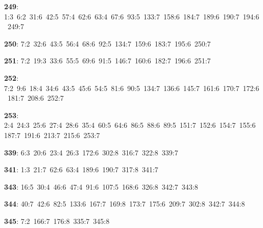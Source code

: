 \noindent \textbf{249}: 1:3\allowbreak\ 6:2\allowbreak\ 31:6\allowbreak\ 42:5\allowbreak\ 57:4\allowbreak\ 62:6\allowbreak\ 63:4\allowbreak\ 67:6\allowbreak\ 93:5\allowbreak\ 133:7\allowbreak\ 158:6\allowbreak\ 184:7\allowbreak\ 189:6\allowbreak\ 190:7\allowbreak\ 194:6\allowbreak\ 249:7\par
\noindent \textbf{250}: 7:2\allowbreak\ 32:6\allowbreak\ 43:5\allowbreak\ 56:4\allowbreak\ 68:6\allowbreak\ 92:5\allowbreak\ 134:7\allowbreak\ 159:6\allowbreak\ 183:7\allowbreak\ 195:6\allowbreak\ 250:7\par
\noindent \textbf{251}: 7:2\allowbreak\ 19:3\allowbreak\ 33:6\allowbreak\ 55:5\allowbreak\ 69:6\allowbreak\ 91:5\allowbreak\ 146:7\allowbreak\ 160:6\allowbreak\ 182:7\allowbreak\ 196:6\allowbreak\ 251:7\par
\noindent \textbf{252}: 7:2\allowbreak\ 9:6\allowbreak\ 18:4\allowbreak\ 34:6\allowbreak\ 43:5\allowbreak\ 45:6\allowbreak\ 54:5\allowbreak\ 81:6\allowbreak\ 90:5\allowbreak\ 134:7\allowbreak\ 136:6\allowbreak\ 145:7\allowbreak\ 161:6\allowbreak\ 170:7\allowbreak\ 172:6\allowbreak\ 181:7\allowbreak\ 208:6\allowbreak\ 252:7\par
\noindent \textbf{253}: 2:4\allowbreak\ 24:3\allowbreak\ 25:6\allowbreak\ 27:4\allowbreak\ 28:6\allowbreak\ 35:4\allowbreak\ 60:5\allowbreak\ 64:6\allowbreak\ 86:5\allowbreak\ 88:6\allowbreak\ 89:5\allowbreak\ 151:7\allowbreak\ 152:6\allowbreak\ 154:7\allowbreak\ 155:6\allowbreak\ 187:7\allowbreak\ 191:6\allowbreak\ 213:7\allowbreak\ 215:6\allowbreak\ 253:7\par
\noindent \textbf{339}: 6:3\allowbreak\ 20:6\allowbreak\ 23:4\allowbreak\ 26:3\allowbreak\ 172:6\allowbreak\ 302:8\allowbreak\ 316:7\allowbreak\ 322:8\allowbreak\ 339:7\par
\noindent \textbf{341}: 1:3\allowbreak\ 21:7\allowbreak\ 62:6\allowbreak\ 63:4\allowbreak\ 189:6\allowbreak\ 190:7\allowbreak\ 317:8\allowbreak\ 341:7\par
\noindent \textbf{343}: 16:5\allowbreak\ 30:4\allowbreak\ 46:6\allowbreak\ 47:4\allowbreak\ 91:6\allowbreak\ 107:5\allowbreak\ 168:6\allowbreak\ 326:8\allowbreak\ 342:7\allowbreak\ 343:8\par
\noindent \textbf{344}: 40:7\allowbreak\ 42:6\allowbreak\ 82:5\allowbreak\ 133:6\allowbreak\ 167:7\allowbreak\ 169:8\allowbreak\ 173:7\allowbreak\ 175:6\allowbreak\ 209:7\allowbreak\ 302:8\allowbreak\ 342:7\allowbreak\ 344:8\par
\noindent \textbf{345}: 7:2\allowbreak\ 166:7\allowbreak\ 176:8\allowbreak\ 335:7\allowbreak\ 345:8\par
